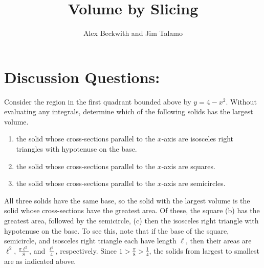 \documentclass[handout]{ximera}
\author{Alex Beckwith and Jim Talamo}
\title{Volume by Slicing}
\begin{document}
\begin{abstract}		
\end{abstract}
\maketitle

\section{Discussion Questions:}
\begin{problem}
Consider the region in the first quadrant bounded above by $y = 4-x^2$. Without evaluating any integrals, determine which of the following solids has the largest volume.
\begin{enumerate}
	\item the solid whose cross-sections parallel to the $x$-axis are isosceles right triangles with hypotenuse on the base.
	\item the solid whose cross-sections parallel to the $x$-axis are squares.
	\item the solid whose cross-sections parallel to the $x$-axis are semicircles.
\end{enumerate}
\begin{freeResponse}
All three solids have the same base, so the solid with the largest volume is the solid whose cross-sections have the greatest area. Of these, the square (b) has the greatest area, followed by the semicircle, (c) then the isosceles right triangle with hypotenuse on the base. To see this, note that if the base of the square, semicircle, and isosceles right triangle each have length $\ell$, then their areas are $\ell^2$, $\frac{\pi \ell^2}{8}$, and $\frac{\ell^2}{4}$, respectively. Since $1 > \frac{\pi}{8} > \frac{1}{4}$, the solids from largest to smallest are as indicated above.
\end{freeResponse}
\end{problem}
\end{document}
